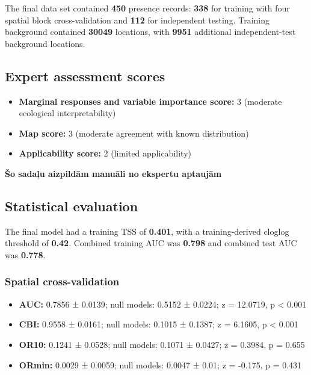 \documentclass[
  openany]{book}
\providecommand{\tightlist}{%
  \setlength{\itemsep}{0pt}\setlength{\parskip}{0pt}}
\providecommand{\tightlist}{%
  \setlength{\itemsep}{0pt}%
  \setlength{\parskip}{0pt}%
}
\begin{document}
The final data set contained \textbf{450} presence records: \textbf{338} for training with four spatial block cross-validation and \textbf{112} for independent testing. Training background contained \textbf{30049} locations, with \textbf{9951} additional independent-test background locations.

\subsection*{Expert assessment scores}\label{expert-assessment-scores-18}

\begin{itemize}
\tightlist
\item
  \textbf{Marginal responses and variable importance score:} 3 (moderate ecological interpretability)
\item
  \textbf{Map score:} 3 (moderate agreement with known distribution)
\item
  \textbf{Applicability score:} 2 (limited applicability)
\end{itemize}

\textbf{Šo sadaļu aizpildām manuāli no ekspertu aptaujām}

\subsection*{Statistical evaluation}\label{statistical-evaluation-18}

The final model had a training TSS of \textbf{0.401}, with a training-derived cloglog threshold of \textbf{0.42}. Combined training AUC was \textbf{0.798} and combined test AUC was \textbf{0.778}.

\subsubsection*{Spatial cross-validation}\label{spatial-cross-validation-18}

\begin{itemize}
\tightlist
\item
  \textbf{AUC:} 0.7856 ± 0.0139; null models: 0.5152 ± 0.0224; z = 12.0719, p \textless{} 0.001
\item
  \textbf{CBI:} 0.9558 ± 0.0161; null models: 0.1015 ± 0.1387; z = 6.1605, p \textless{} 0.001
\item
  \textbf{OR10:} 0.1241 ± 0.0528; null models: 0.1071 ± 0.0427; z = 0.3984, p = 0.655
\item
  \textbf{ORmin:} 0.0029 ± 0.0059; null models: 0.0047 ± 0.01; z = -0.175, p = 0.431
\end{itemize}
\end{document}
